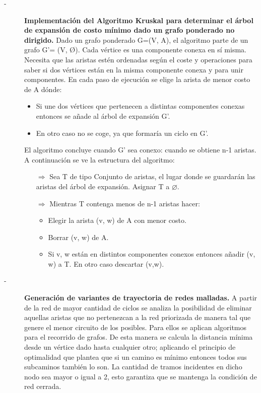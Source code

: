 \begin{description}
    \item[-]\textbf{Implementación del Algoritmo Kruskal para determinar el árbol de expansión de costo mínimo dado un grafo ponderado no dirigido.} Dado un grafo ponderado G=(V, A), el algoritmo parte de un grafo G’= (V, Ø). Cada vértice es una componente conexa en sí misma. Necesita que las aristas estén ordenadas según el coste y operaciones para saber si dos vértices están en la misma componente conexa y para unir componentes. En cada paso de ejecución se elige la arista de menor costo de A dónde:
    \begin{itemize}
        \item Si une dos vértices que pertenecen a distintas componentes conexas entonces se añade al árbol de expansión G’.
        \item En otro caso no se coge, ya que formaría un ciclo en G’.
    \end{itemize}
    \noindent El algoritmo concluye cuando G’ sea conexo: cuando se obtiene n-1 aristas. A continuación se ve la estructura del algoritmo:
    \begin{itemize}
        \item[$\Rightarrow$] Sea T de tipo Conjunto de aristas, el lugar donde se guardarán las aristas del árbol de expansión. Asignar T a $\varnothing$.
        \item[$\Rightarrow$] Mientras T contenga menos de n-1 aristas hacer:
        \begin{itemize}
            \item Elegir la arista (v, w) de A con menor costo.
            \item Borrar (v, w) de A.
            \item Si v, w están en distintos componentes conexos entonces añadir (v, w) a T. En otro caso descartar (v,w).
        \end{itemize}
    \end{itemize}
    \newpage
    \item[-]\textbf{Generación de variantes de trayectoria de redes malladas.} A partir de la red de mayor cantidad de ciclos se analiza la posibilidad de eliminar aquellas aristas que no pertenezcan a la red priorizada de manera tal que genere el menor circuito de los posibles. Para ellos se aplican algoritmos para el recorrido de grafos. De esta manera se calcula la distancia mínima desde un vértice dado hasta cualquier otro; aplicando el principio de optimalidad que plantea que si un camino es mínimo entonces todos  sus subcaminos también lo son. La cantidad de tramos incidentes en dicho nodo sea mayor o igual a 2, esto garantiza que se mantenga la condición de red cerrada.

\end{description}

